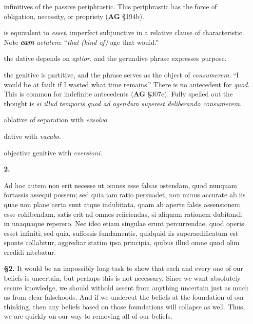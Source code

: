  infinitives of the passive periphrastic. This periphrastic has the force of obligation, necessity, or propriety (\textbf{AG} §194b).

 is equivalent to \textit{esset}, imperfect subjunctive in a relative clause of characteristic. Note \textit{\textbf{eam} aetatem}: ``\textit{that (kind of)} age that would.''

 the dative depends on \textit{aptior}, and the gerundive phrase expresses purpose.

 the genitive is partitive, and the phrase serves as the object of \textit{consumerem}: ``I would be at fault if I wasted what time remains.'' There is no antecedent for \textit{quod}. This is common for indefinite antecedents (\textbf{AG} §307c). Fully spelled out the thought is \textit{si illud temporis quod ad agendum superest deliberando consumerem}.

 ablative of separation with \textit{exsolvo}.

 dative with \textit{vacabo}.

 objective genitive with \textit{eversioni}.


\clearpage

\beginnumbering
\pstart
\textbf{2.} \begin{latin}Ad hoc autem non erit necesse ut omnes esse falsas ostendam, quod nunquam fortassis assequi possem; sed quia iam ratio persuadet, non minus accurate ab iis quae non plane certa sunt atque indubitata, quam ab aperte falsis assensionem esse cohibendam, satis erit ad omnes reiiciendas, si aliquam rationem dubitandi in unaquaque reperero. Nec ideo etiam singulae erunt percurrendae, quod operis esset infiniti; sed quia, suffossis fundamentis, quidquid iis superaedificatum est sponte collabitur, aggrediar statim ipsa principia, quibus illud omne quod olim credidi nitebatur.\end{latin}
\pend
\endnumbering

\prenotes

\textbf{§2.} It would be an impossibly long task to show that each and every one of our beliefs is uncertain, but perhaps this is not necessary. Since we want absolutely secure knowledge, we should withold assent from anything uncertain just as much as from clear falsehoods. And if we undercut the beliefs at the foundation of our thinking, then any beliefs based on those foundations will collapse as well. Thus, we are quickly on our way to removing all of our beliefs.

